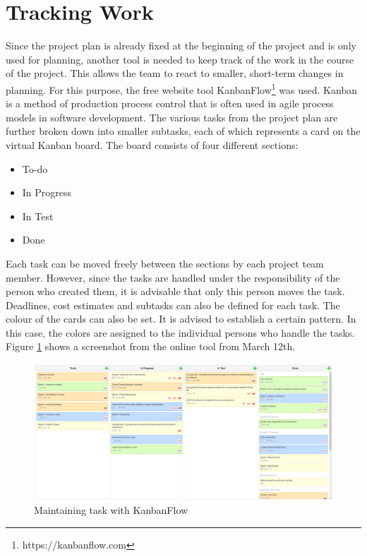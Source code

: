 \section{Tracking Work}
Since the project plan is already fixed at the beginning of the project and is only used for planning, another tool is needed to keep track of the work in the course of the project. This allows the team to react to smaller, short-term changes in planning. For this purpose, the free website tool KanbanFlow\footnote{https://kanbanflow.com} was used. Kanban is a method of production process control that is often used in agile process models in software development. The various tasks from the project plan are further broken down into smaller subtasks, each of which represents a card on the virtual Kanban board. The board consists of four different sections:
\begin{itemize}
	\item To-do
	\item In Progress
	\item In Test
	\item Done
\end{itemize}
Each task can be moved freely between the sections by each project team member. However, since the tasks are handled under the responsibility of the person who created them, it is advisable that only this person moves the task. Deadlines, cost estimates and subtasks can also be defined for each task. The colour of the cards can also be set. It is advised to establish a certain pattern. In this case, the colors are assigned to the individual persons who handle the tasks. Figure \ref{kanbanflow} shows a screenshot from the online tool from March 12th.
\begin{landscape}
	\thispagestyle{plain}
	\begin{figure}[H]
		\centering
		\includegraphics[width =1.4\textwidth]{images/kanbanflow.PNG}
		\caption{Maintaining task with KanbanFlow}
		\label{kanbanflow}
	\end{figure}
\end{landscape}
